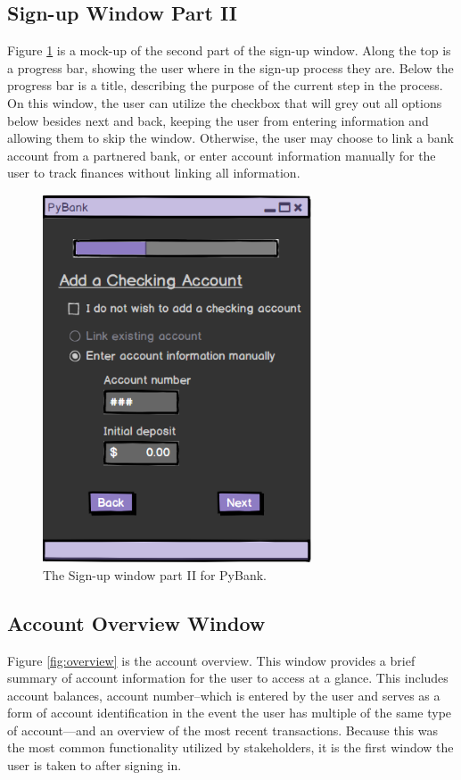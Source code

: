 \subsection{Sign-up Window Part II}
\label{sect:signup_window}

Figure \ref{fig:signup} is a mock-up of the second part of the sign-up window. Along the top is a progress bar, showing the user where in the sign-up process they are. Below the progress bar is a title, describing the purpose of the current step in the process. On this window, the user can utilize the checkbox that will grey out all options below besides next and back, keeping the user from entering information and allowing them to skip the window. Otherwise, the user may choose to link a bank account from a partnered bank, or enter account information manually for the user to track finances without linking all information.

\FloatBarrier
\begin{figure}[!ht]
    \centering
    \includegraphics[width=8cm]{figures/signup.png}
    \caption{The Sign-up window part II for PyBank.}
    \label{fig:signup}
\end{figure}

\newpage

\subsection{Account Overview Window}
\label{sect:acct_overview}

Figure \ref{fig:overview} is the account overview. This window provides a brief summary of account information for the user to access at a glance. This includes account balances, account number--which is entered by the user and serves as a form of account identification in the event the user has multiple of the same type of account—and an overview of the most recent transactions. Because this was the most common functionality utilized by stakeholders, it is the first window the user is taken to after signing in.

